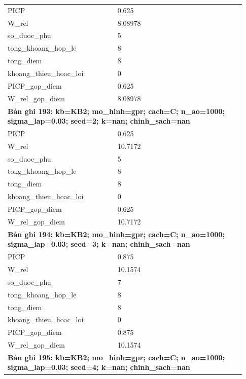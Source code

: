 \begin{longtable}{p{0.43\linewidth}p{0.50\linewidth}}
PICP & 0.625 \\
W\_\allowbreak rel & 8.08978 \\
so\_\allowbreak duoc\_\allowbreak phu & 5 \\
tong\_\allowbreak khoang\_\allowbreak hop\_\allowbreak le & 8 \\
tong\_\allowbreak diem & 8 \\
khoang\_\allowbreak thieu\_\allowbreak hoac\_\allowbreak loi & 0 \\
PICP\_\allowbreak gop\_\allowbreak diem & 0.625 \\
W\_\allowbreak rel\_\allowbreak gop\_\allowbreak diem & 8.08978 \\
\midrule
\multicolumn{2}{p{0.95\linewidth}}{\textbf{Bản ghi 193: kb=KB2; mo\_hinh=gpr; cach=C; n\_ao=1000; sigma\_lap=0.03; seed=2; k=nan; chinh\_sach=nan}} \\
PICP & 0.625 \\
W\_\allowbreak rel & 10.7172 \\
so\_\allowbreak duoc\_\allowbreak phu & 5 \\
tong\_\allowbreak khoang\_\allowbreak hop\_\allowbreak le & 8 \\
tong\_\allowbreak diem & 8 \\
khoang\_\allowbreak thieu\_\allowbreak hoac\_\allowbreak loi & 0 \\
PICP\_\allowbreak gop\_\allowbreak diem & 0.625 \\
W\_\allowbreak rel\_\allowbreak gop\_\allowbreak diem & 10.7172 \\
\midrule
\multicolumn{2}{p{0.95\linewidth}}{\textbf{Bản ghi 194: kb=KB2; mo\_hinh=gpr; cach=C; n\_ao=1000; sigma\_lap=0.03; seed=3; k=nan; chinh\_sach=nan}} \\
PICP & 0.875 \\
W\_\allowbreak rel & 10.1574 \\
so\_\allowbreak duoc\_\allowbreak phu & 7 \\
tong\_\allowbreak khoang\_\allowbreak hop\_\allowbreak le & 8 \\
tong\_\allowbreak diem & 8 \\
khoang\_\allowbreak thieu\_\allowbreak hoac\_\allowbreak loi & 0 \\
PICP\_\allowbreak gop\_\allowbreak diem & 0.875 \\
W\_\allowbreak rel\_\allowbreak gop\_\allowbreak diem & 10.1574 \\
\midrule
\multicolumn{2}{p{0.95\linewidth}}{\textbf{Bản ghi 195: kb=KB2; mo\_hinh=gpr; cach=C; n\_ao=1000; sigma\_lap=0.03; seed=4; k=nan; chinh\_sach=nan}} \\

\end{longtable}
